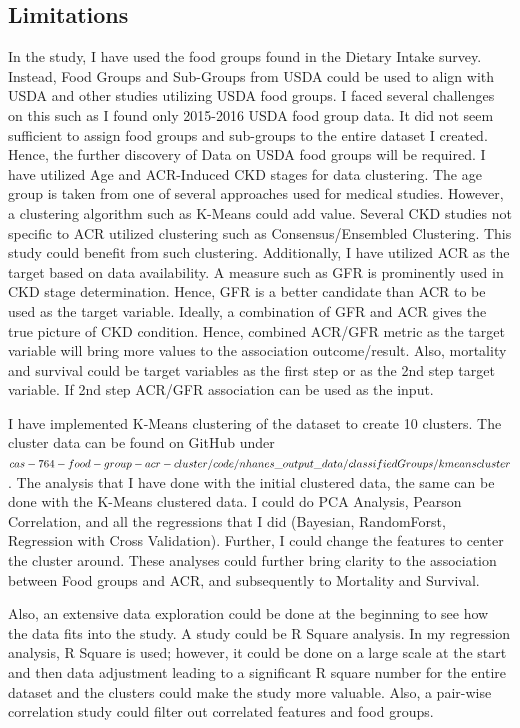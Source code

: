 \subsection {Limitations}
\flushleft \justifying In the study, I have used the food groups found in the Dietary Intake survey. Instead, Food Groups and Sub-Groups from USDA could be used to align with USDA and other studies utilizing USDA food groups. I faced several challenges on this such as I found only 2015-2016 USDA food group data. It did not seem sufficient to assign food groups and sub-groups to the entire dataset I created. Hence, the further discovery of Data on USDA food groups will be required. I have utilized Age and ACR-Induced CKD stages for data clustering. The age group is taken from one of several approaches used for medical studies. However, a clustering algorithm such as K-Means could add value. Several CKD studies not specific to ACR utilized clustering such as Consensus/Ensembled Clustering. This study could benefit from such clustering. Additionally, I have utilized ACR as the target based on data availability. A measure such as GFR is prominently used in CKD stage determination. Hence, GFR is a better candidate than ACR to be used as the target variable. Ideally, a combination of GFR and ACR gives the true picture of CKD condition. Hence, combined ACR/GFR metric as the target variable will bring more values to the association outcome/result. Also, mortality and survival could be target variables as the first step or as the 2nd step target variable. If 2nd step ACR/GFR association can be used as the input.

\flushleft \justifying I have implemented K-Means clustering of the dataset to create 10 clusters. The cluster data can be found on GitHub under $cas-764-food-group-acr-cluster/ code/ nhanes\_output\_data \\ /classifiedGroups/ kmeanscluster$. The analysis that I have done with the initial clustered data, the same can be done with the K-Means clustered data. I could do PCA Analysis, Pearson Correlation, and all the regressions that I did (Bayesian, RandomForst, Regression with Cross Validation). Further, I could change the features to center the cluster around. These analyses could further bring clarity to the association between Food groups and ACR, and subsequently to Mortality and Survival.

\flushleft \justifying  Also, an extensive data exploration could be done at the beginning to see how the data fits into the study. A study could be R Square analysis. In my regression analysis, R Square is used; however, it could be done on a large scale at the start and then data adjustment leading to a significant R square number for the entire dataset and the clusters could make the study more valuable. Also, a pair-wise correlation study could filter out correlated features and food groups.

